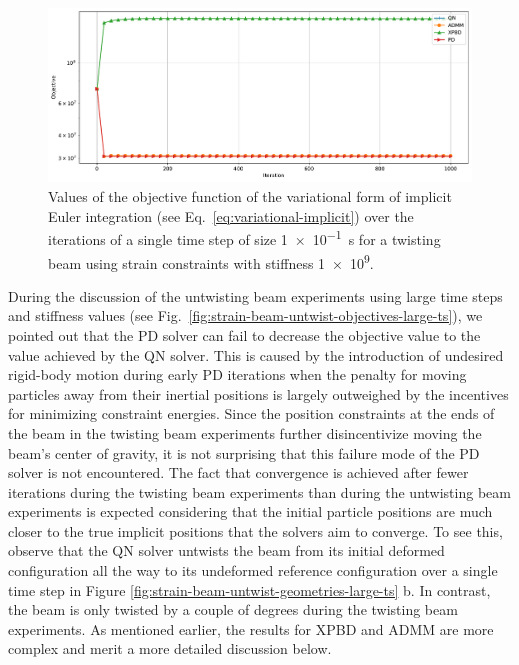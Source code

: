 \begin{figure}[h]
    \includegraphics[width=\textwidth]{figures/strain_beam_twist_typical_objectives.pdf}
    \caption{Values of the objective function of the variational form of implicit Euler integration (see Eq.\ \ref{eq:variational-implicit}) over the iterations of 
        a single time step of size \SI{1e-1}{\second} for a twisting beam using strain constraints with stiffness \num{1e9}.}
    \label{fig:strain-beam-twist-typical-objectives}
\end{figure}

During the discussion of the untwisting beam experiments using large time steps and stiffness values (see Fig.\ \ref{fig:strain-beam-untwist-objectives-large-ts}),
we pointed out that the PD solver can fail to decrease the objective value to the value achieved by the QN solver. This is caused by the introduction of 
undesired rigid-body motion during early PD iterations when the penalty for moving particles away from their inertial positions is largely outweighed by the incentives 
for minimizing constraint energies. Since the position constraints at the ends of the beam in the twisting beam experiments further disincentivize moving the beam's 
center of gravity, it is not surprising that this failure mode of the PD solver is not encountered. The fact that convergence is achieved after fewer iterations 
during the twisting beam experiments than during the untwisting beam experiments is expected considering that the initial particle positions are much closer to the true 
implicit positions that the solvers aim to converge. To see this, observe that the QN solver untwists the beam from its initial deformed configuration all the way to its 
undeformed reference configuration over a single time step in Figure \ref{fig:strain-beam-untwist-geometries-large-ts} b. In contrast, the beam is only twisted by a 
couple of degrees during the twisting beam experiments. As mentioned earlier, the results for XPBD and ADMM are more complex and merit a more detailed discussion below.

